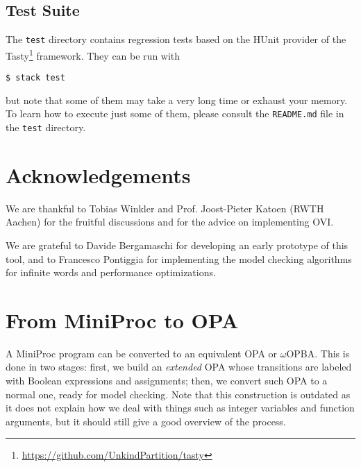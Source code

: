 \documentclass[9pt,a4paper]{article}
\begin{document}
\subsection{Test Suite}
The \texttt{test} directory contains regression tests based on the HUnit
provider of the Tasty\footnote{\url{https://github.com/UnkindPartition/tasty}} framework.
They can be run with
\begin{verbatim}
$ stack test
\end{verbatim}
but note that some of them may take a very long time or exhaust your memory.
To learn how to execute just some of them, please consult the \texttt{README.md}
file in the \texttt{test} directory.

\section*{Acknowledgements}
We are thankful to Tobias Winkler and Prof. Joost-Pieter Katoen (RWTH Aachen)
for the fruitful discussions and for the advice on implementing OVI.

We are grateful to Davide Bergamaschi for developing an early prototype of this tool,
and to Francesco Pontiggia for implementing the model checking algorithms
for infinite words and performance optimizations.

%




\appendix

\section{From MiniProc to OPA}
\label{sec:miniproc-to-opa}

A MiniProc program can be converted to an equivalent OPA or $\omega$OPBA.
This is done in two stages: first, we build an \emph{extended} OPA whose transitions are labeled with Boolean expressions and assignments; then, we convert such OPA to a normal one, ready for model checking.
Note that this construction is outdated as it does not explain how we deal with things such as integer variables and function arguments, but it should still give a good overview of the process.
\end{document}
